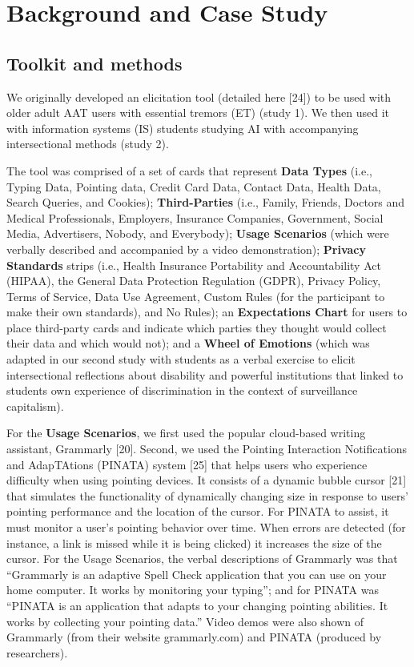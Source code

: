 \documentclass[11pt,dvipdfm]{article}
\begin{document}
\section{Background and Case Study}
\subsection{Toolkit and methods}
We originally developed an elicitation tool (detailed here [24]) to be used with older adult AAT users with essential tremors (ET) (study 1). We then used it with information systems (IS) students studying AI with accompanying intersectional methods (study 2). 

The tool was comprised of a set of cards that represent \textbf{Data Types} (i.e., Typing Data, Pointing data, Credit Card Data, Contact Data, Health Data, Search Queries, and Cookies); \textbf{Third-Parties} (i.e., Family, Friends, Doctors and Medical Professionals, Employers, Insurance Companies, Government, Social Media, Advertisers, Nobody, and Everybody); \textbf{Usage Scenarios} (which were verbally described and accompanied by a video demonstration); \textbf{Privacy Standards} strips (i.e., Health Insurance Portability and Accountability Act (HIPAA), the General Data Protection Regulation (GDPR), Privacy Policy, Terms of Service, Data Use Agreement, Custom Rules (for the participant to make their own standards), and No Rules); an \textbf{Expectations Chart} for users to place third-party cards and indicate which parties they thought would collect their data and which would not); and a \textbf{Wheel of Emotions} (which was adapted in our second study with students as a verbal exercise to elicit intersectional reflections about disability and powerful institutions that linked to students own experience of discrimination in the context of surveillance capitalism). 

For the \textbf{Usage Scenarios}, we first used the popular cloud-based writing assistant, Grammarly [20]. Second, we used the Pointing Interaction Notifications and AdapTAtions (PINATA) system [25] that helps users who experience difficulty when using pointing devices. It consists of a dynamic bubble cursor [21] that simulates the functionality of dynamically changing size in response to users’ pointing performance and the location of the cursor. For PINATA to assist, it must monitor a user’s pointing behavior over time. When errors are detected (for instance, a link is missed while it is being clicked) it increases the size of the cursor. For the Usage Scenarios, the verbal descriptions of Grammarly was that “Grammarly is an adaptive Spell Check application that you can use on your home computer. It works by monitoring your typing”; and for PINATA was “PINATA is an application that adapts to your changing pointing abilities. It works by collecting your pointing data.” Video demos were also shown of Grammarly (from their website grammarly.com) and PINATA (produced by researchers).  
\end{document}
